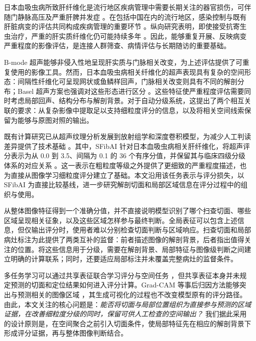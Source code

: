 日本血吸虫病所致肝纤维化是流行地区疾病管理中需要长期关注的器官损伤，可伴随门静脉高压及严重肝脾并发症 \citep{colley2014schistosomiasis,mcmanus2018schistosomiasis}。在包括中国在内的流行地区，感染控制与既有肝脏病变的评估共同构成疾病管理的重要环节 \citep{mcmanus2010china,lo2022who}。纵向研究表明，即使接受抗寄生虫治疗，严重的肝实质纤维化仍可能持续多年 \citep{carlton2010morbidity}。因此，能够重复开展、反映病变严重程度的影像评估，是连接人群筛查、病情评估与长期随访的重要基础。

B-mode 超声能够非侵入性地呈现肝实质与门脉相关改变，为上述评估提供了可重复使用的影像工具。然而，日本血吸虫病相关纤维化的超声表现具有复杂的空间形态：间隔性纤维化可呈现网状或鱼鳞样回声，门脉相关改变则具有不同的解剖分布；Basel 超声方案也强调对这些形态进行区分 \citep{richter2025basel}。这些特征使严重程度评估需要同时考虑局部回声、结构分布与解剖背景。对于自动分级系统，这提出了两个相互关联的要求：从复杂影像中提取足以支持细粒度评分的信息，以及将相关空间线索保留为能够与原图对照的输出。

既有计算研究已从超声纹理分析发展到放射组学和深度卷积模型，为减少人工判读差异提供了技术基础 \citep{yeh2003fibrosis,guo2024radiomics,lee2020ultrasound}。其中，SFibAI 针对日本血吸虫病相关肝纤维化，将超声评分表示为从 0.0 到 3.5、间隔为 0.1 的 36 个有序分值，并保留其与临床四级分级体系的对应关系 \citep{xu2026sfibai}。这一表示在粗粒度等级之外提供了更细致的严重程度描述，也为直接从图像学习细粒度评分建立了基础。本文沿用该任务表示与评分损失，以 SFibAI 为直接比较基线，进一步研究解剖切面和局部区域信息在评分过程中的组织与使用。

从整体图像特征得到一个准确分值，并不直接说明模型识别了哪个扫查切面、哪些区域呈现相关征象，以及这些区域怎样参与最终判断。全局表征可以包含上述信息，但仅输出评分时，使用者难以分别检查切面判断与区域响应。扫查切面和局部病灶标注为此提供了两类互补的监督：前者描述图像的解剖背景，后者指出值得关注的位置。将这些信息用于分级，需要在解剖背景、局部特征与图像级判断之间建立明确的计算联系；同时，还要适应局部标注并未覆盖完整病灶的监督条件。

多任务学习可以通过共享表征联合学习评分与空间任务 \citep{caruana1997multitask}，但共享表征本身并未规定预测的切面和定位结果如何进入评分计算。Grad-CAM 等事后归因方法能够突出与预测相关的图像区域 \citep{selvaraju2017gradcam}，其生成可视化的过程也不改变模型原有的评分路径。由此，本文关注的核心问题是：\emph{能否将切面与局部位置组织为直接参与预测的区域证据，在改善细粒度分级的同时，保留可供人工检查的空间输出？} 我们据此采用的设计原则是，在空间聚合之前引入切面条件，使局部特征先在相应的解剖背景下形成评分证据，再与整体图像判断结合。

